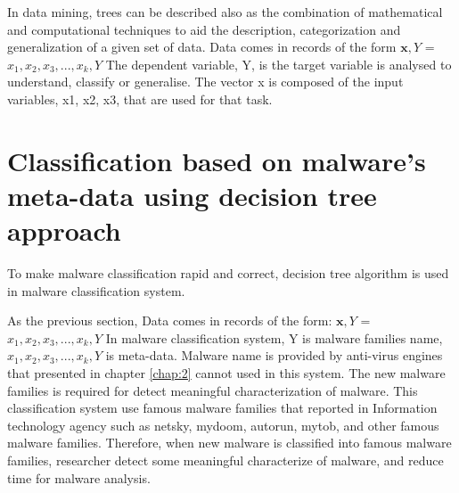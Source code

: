 In data mining, trees can be described also as the combination of mathematical and computational techniques to aid the description, categorization and generalization of a given set of data.
Data comes in records of the form
\(\textbf{x},Y\) = \(x_1, x_2, x_3, ..., x_k, Y\)
The dependent variable, Y, is the target variable is analysed to understand, classify or generalise. The vector x is composed of the input variables, x1, x2, x3, that are used for that task.
\section{Classification based on malware's meta-data using decision tree approach}
To make malware classification rapid and correct, decision tree algorithm is used in malware classification system.

As the previous section, Data comes in records of the form:
\(\textbf{x},Y\) = \(x_1, x_2, x_3, ..., x_k, Y\)
In malware classification system, Y is malware families name, \(x_1, x_2, x_3, ..., x_k, Y\) is meta-data. Malware name is provided by anti-virus engines that presented in chapter \ref{chap:2} cannot used in this system. The new malware families is required for detect meaningful characterization of malware. This classification system use famous malware families that reported in Information technology agency such as netsky, mydoom, autorun, mytob, and other famous malware families. Therefore, when new malware is classified into famous malware families, researcher detect some meaningful characterize of malware, and reduce time for malware analysis. 

